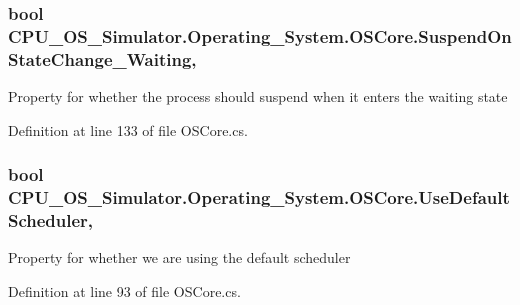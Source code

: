 \subsubsection[{Suspend\+On\+State\+Change\+\_\+\+Waiting}]{\setlength{\rightskip}{0pt plus 5cm}bool C\+P\+U\+\_\+\+O\+S\+\_\+\+Simulator.\+Operating\+\_\+\+System.\+O\+S\+Core.\+Suspend\+On\+State\+Change\+\_\+\+Waiting\hspace{0.3cm}{\ttfamily [get]}, {\ttfamily [set]}}\label{class_c_p_u___o_s___simulator_1_1_operating___system_1_1_o_s_core_a431f6636a3265ebd4c87f973b49a5195}


Property for whether the process should suspend when it enters the waiting state 



Definition at line 133 of file O\+S\+Core.\+cs.

\hypertarget{class_c_p_u___o_s___simulator_1_1_operating___system_1_1_o_s_core_a1fd8b54b31fa415f09f2b9bc407802dd}{}
\subsubsection[{Use\+Default\+Scheduler}]{\setlength{\rightskip}{0pt plus 5cm}bool C\+P\+U\+\_\+\+O\+S\+\_\+\+Simulator.\+Operating\+\_\+\+System.\+O\+S\+Core.\+Use\+Default\+Scheduler\hspace{0.3cm}{\ttfamily [get]}, {\ttfamily [set]}}\label{class_c_p_u___o_s___simulator_1_1_operating___system_1_1_o_s_core_a1fd8b54b31fa415f09f2b9bc407802dd}


Property for whether we are using the default scheduler 



Definition at line 93 of file O\+S\+Core.\+cs.

\hypertarget{class_c_p_u___o_s___simulator_1_1_operating___system_1_1_o_s_core_ac965e1317dc5c6b6ae93c410098dd913}{}
